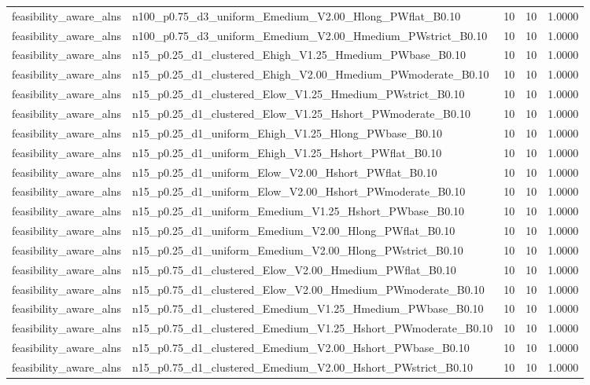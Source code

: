 \begin{tabular}{llrrr}
feasibility_aware_alns & n100_p0.75_d3_uniform_Emedium_V2.00_Hlong_PWflat_B0.10 & 10 & 10 & 1.0000 \\
feasibility_aware_alns & n100_p0.75_d3_uniform_Emedium_V2.00_Hmedium_PWstrict_B0.10 & 10 & 10 & 1.0000 \\
feasibility_aware_alns & n15_p0.25_d1_clustered_Ehigh_V1.25_Hmedium_PWbase_B0.10 & 10 & 10 & 1.0000 \\
feasibility_aware_alns & n15_p0.25_d1_clustered_Ehigh_V2.00_Hmedium_PWmoderate_B0.10 & 10 & 10 & 1.0000 \\
feasibility_aware_alns & n15_p0.25_d1_clustered_Elow_V1.25_Hmedium_PWstrict_B0.10 & 10 & 10 & 1.0000 \\
feasibility_aware_alns & n15_p0.25_d1_clustered_Elow_V1.25_Hshort_PWmoderate_B0.10 & 10 & 10 & 1.0000 \\
feasibility_aware_alns & n15_p0.25_d1_uniform_Ehigh_V1.25_Hlong_PWbase_B0.10 & 10 & 10 & 1.0000 \\
feasibility_aware_alns & n15_p0.25_d1_uniform_Ehigh_V1.25_Hshort_PWflat_B0.10 & 10 & 10 & 1.0000 \\
feasibility_aware_alns & n15_p0.25_d1_uniform_Elow_V2.00_Hshort_PWflat_B0.10 & 10 & 10 & 1.0000 \\
feasibility_aware_alns & n15_p0.25_d1_uniform_Elow_V2.00_Hshort_PWmoderate_B0.10 & 10 & 10 & 1.0000 \\
feasibility_aware_alns & n15_p0.25_d1_uniform_Emedium_V1.25_Hshort_PWbase_B0.10 & 10 & 10 & 1.0000 \\
feasibility_aware_alns & n15_p0.25_d1_uniform_Emedium_V2.00_Hlong_PWflat_B0.10 & 10 & 10 & 1.0000 \\
feasibility_aware_alns & n15_p0.25_d1_uniform_Emedium_V2.00_Hlong_PWstrict_B0.10 & 10 & 10 & 1.0000 \\
feasibility_aware_alns & n15_p0.75_d1_clustered_Elow_V2.00_Hmedium_PWflat_B0.10 & 10 & 10 & 1.0000 \\
feasibility_aware_alns & n15_p0.75_d1_clustered_Elow_V2.00_Hmedium_PWmoderate_B0.10 & 10 & 10 & 1.0000 \\
feasibility_aware_alns & n15_p0.75_d1_clustered_Emedium_V1.25_Hmedium_PWbase_B0.10 & 10 & 10 & 1.0000 \\
feasibility_aware_alns & n15_p0.75_d1_clustered_Emedium_V1.25_Hshort_PWmoderate_B0.10 & 10 & 10 & 1.0000 \\
feasibility_aware_alns & n15_p0.75_d1_clustered_Emedium_V2.00_Hshort_PWbase_B0.10 & 10 & 10 & 1.0000 \\
feasibility_aware_alns & n15_p0.75_d1_clustered_Emedium_V2.00_Hshort_PWstrict_B0.10 & 10 & 10 & 1.0000 \\

\end{tabular}
